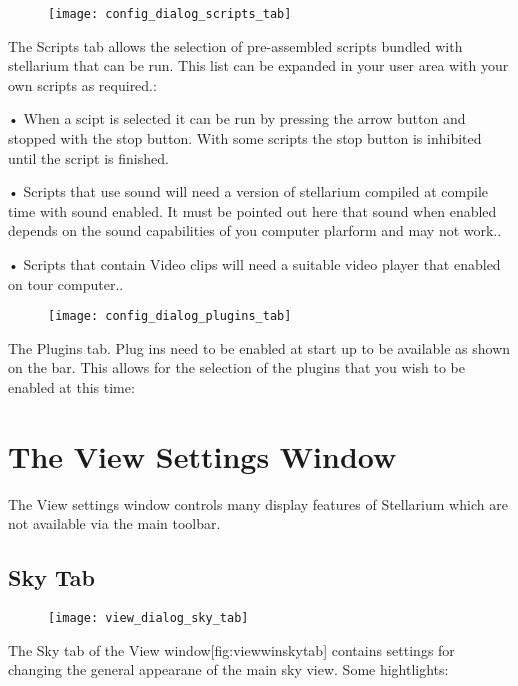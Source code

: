 \begin{figure}[h]
\centering\texttt{[image: config\_dialog\_scripts\_tab]}
\end{figure}

The Scripts tab allows the selection of pre-assembled scripts bundled
with stellarium that can be run. This list can be expanded in your user
area with your own scripts as required.:

• When a scipt is selected it can be run by pressing the arrow button
and stopped with the stop button. With some scripts the stop button is
inhibited until the script is finished.

• Scripts that use sound will need a version of stellarium compiled at
compile time with sound enabled. It must be pointed out here that sound
when enabled depends on the sound capabilities of you computer plarform
and may not work..

• Scripts that contain Video clips will need a suitable video player
that enabled on tour computer..

\begin{figure}[h]
\centering\texttt{[image: config\_dialog\_plugins\_tab]}
\end{figure}

The Plugins tab. Plug ins need to be enabled at start up to be available
as shown on the bar. This allows for the selection of the plugins that
you wish to be enabled at this time:

\section{The View Settings Window}\label{the-view-settings-window}

The View settings window controls many display features of Stellarium
which are not available via the main toolbar.

\subsection{Sky Tab}\label{sky-tab}

\begin{figure}[h]
\centering\texttt{[image: view\_dialog\_sky\_tab]}
\end{figure}

The Sky tab of the View window{[}fig:viewwinskytab{]} contains settings
for changing the general appearane of the main sky view. Some
hightlights:

